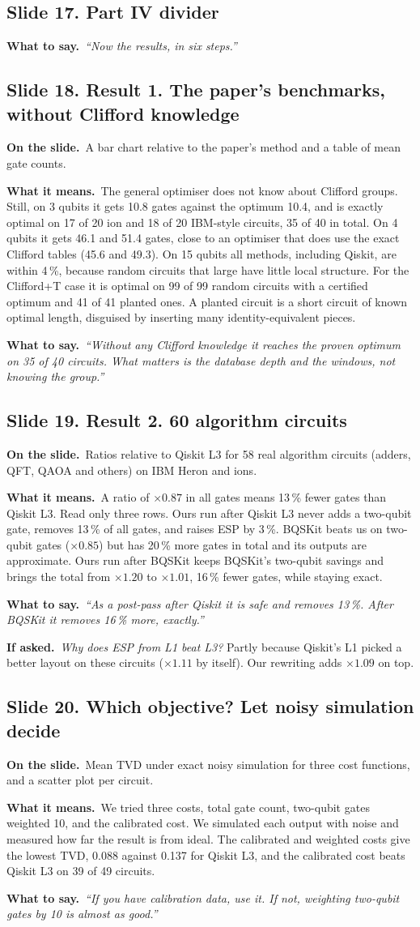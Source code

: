 \documentclass[11pt,a4paper]{article}
\newcommand{\say}[1]{\emph{``#1''}}
\newcommand{\slide}[2]{\subsection*{Slide #1. #2}}
\newcommand{\shows}{\par\textbf{\color{ibar}On the slide.}\ }
\newcommand{\means}{\par\textbf{\color{ibar}What it means.}\ }
\newcommand{\tosay}{\par\textbf{\color{ibar}What to say.}\ }
\newcommand{\ifasked}{\par\textbf{\color{ibar}If asked.}\ }
\begin{document}
\slide{17}{Part IV divider}
\tosay \say{Now the results, in six steps.}

\slide{18}{Result 1. The paper's benchmarks, without Clifford knowledge}
\shows A bar chart relative to the paper's method and a table of mean gate counts.
\means The general optimiser does not know about Clifford groups. Still, on 3 qubits it gets 10.8 gates against the
optimum 10.4, and is exactly optimal on 17 of 20 ion and 18 of 20 IBM-style circuits, 35 of 40 in total. On 4 qubits it
gets 46.1 and 51.4 gates, close to an optimiser that does use the exact Clifford tables (45.6 and 49.3). On 15 qubits all
methods, including Qiskit, are within 4\,\%, because random circuits that large have little local structure. For the
Clifford+T case it is optimal on 99 of 99 random circuits with a certified optimum and 41 of 41 planted ones. A planted
circuit is a short circuit of known optimal length, disguised by inserting many identity-equivalent pieces.
\tosay \say{Without any Clifford knowledge it reaches the proven optimum on 35 of 40 circuits. What matters is the database
depth and the windows, not knowing the group.}

\slide{19}{Result 2. 60 algorithm circuits}
\shows Ratios relative to Qiskit L3 for 58 real algorithm circuits (adders, QFT, QAOA and others) on IBM Heron and ions.
\means A ratio of $\times0.87$ in all gates means 13\,\% fewer gates than Qiskit L3. Read only three rows. Ours run after
Qiskit L3 never adds a two-qubit gate, removes 13\,\% of all gates, and raises ESP by 3\,\%. BQSKit beats us on two-qubit
gates ($\times0.85$) but has 20\,\% more gates in total and its outputs are approximate. Ours run after BQSKit keeps
BQSKit's two-qubit savings and brings the total from $\times1.20$ to $\times1.01$, 16\,\% fewer gates, while staying exact.
\tosay \say{As a post-pass after Qiskit it is safe and removes 13\,\%. After BQSKit it removes 16\,\% more, exactly.}
\ifasked \emph{Why does ESP from L1 beat L3?} Partly because Qiskit's L1 picked a better layout on these circuits
($\times1.11$ by itself). Our rewriting adds $\times1.09$ on top.

\slide{20}{Which objective? Let noisy simulation decide}
\shows Mean TVD under exact noisy simulation for three cost functions, and a scatter plot per circuit.
\means We tried three costs, total gate count, two-qubit gates weighted 10, and the calibrated cost. We simulated each
output with noise and measured how far the result is from ideal. The calibrated and weighted costs give the lowest TVD,
0.088 against 0.137 for Qiskit L3, and the calibrated cost beats Qiskit L3 on 39 of 49 circuits.
\tosay \say{If you have calibration data, use it. If not, weighting two-qubit gates by 10 is almost as good.}
\end{document}
